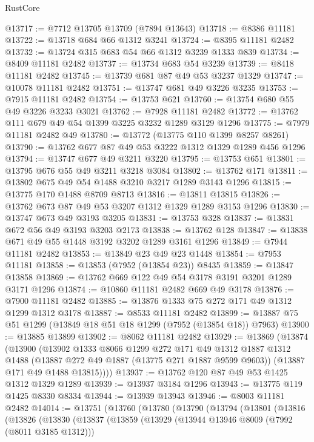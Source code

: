\begin{lexlean}{RustCore}
\begin{coremodule}
@13717 := @7712 @13705 @13709 (@7894 @13643)
@13718 := @8386 @11181
@13722 := @13718 @684 @66 @1312 @3241
@13724 := @8395 @11181 @2482
@13732 := @13724 @315 @683 @54 @66 @1312 @3239 @1333 @839
@13734 := @8409 @11181 @2482
@13737 := @13734 @683 @54 @3239
@13739 := @8418 @11181 @2482
@13745 := @13739 @681 @87 @49 @53 @3237 @1329
@13747 := @10078 @11181 @2482
@13751 := @13747 @681 @49 @3226 @3235
@13753 := @7915 @11181 @2482
@13754 := @13753 @621
@13760 := @13754 @680 @55 @49 @3226 @3233 @3021
@13762 := @7928 @11181 @2482
@13772 := @13762 @111 @679 @49 @54 @1399 @3225 @3232 @1289 @3129 @1296
@13775 := @7979 @11181 @2482 @49
@13780 := @13772 (@13775 @110 @1399 @8257 @8261)
@13790 := @13762 @677 @87 @49 @53 @3222 @1312 @1329 @1289 @456 @1296
@13794 := @13747 @677 @49 @3211 @3220
@13795 := @13753 @651
@13801 := @13795 @676 @55 @49 @3211 @3218 @3084
@13802 := @13762 @171
@13811 := @13802 @675 @49 @54 @1488 @3210 @3217 @1289 @3143 @1296
@13815 := @13775 @170 @1488 @8709 @8713
@13816 := @13811 @13815
@13826 := @13762 @673 @87 @49 @53 @3207 @1312 @1329 @1289 @3153 @1296
@13830 := @13747 @673 @49 @3193 @3205
@13831 := @13753 @328
@13837 := @13831 @672 @56 @49 @3193 @3203 @2173
@13838 := @13762 @128
@13847 := @13838 @671 @49 @55 @1448 @3192 @3202 @1289 @3161 @1296
@13849 := @7944 @11181 @2482
@13853 := @13849 @23 @49 @23 @1448
@13854 := @7953 @11181
@13858 := @13853 (@7952 (@13854 @23)) @8435
@13859 := @13847 @13858
@13869 := @13762 @669 @122 @49 @54 @3178 @3191 @3201 @1289 @3171 @1296
@13874 := @10860 @11181 @2482 @669 @49 @3178
@13876 := @7900 @11181 @2482
@13885 := @13876 @1333 @75 @272 @171 @49 @1312 @1299 @1312 @3178
@13887 := @8533 @11181 @2482
@13899 := @13887 @75 @51 @1299 (@13849 @18 @51 @18 @1299 (@7952 (@13854 @18)) @7963)
@13900 := @13885 @13899
@13902 := @8062 @11181 @2482
@13929 := @13869
    (@13874
      (@13900
        (@13902
          @1333
          @8066
          @1299
          @272
          @171
          @49
          @1312
          @1887
          @1312
          @1488
          (@13887 @272 @49 @1887 (@13775 @271 @1887 @9599 @9603))
          (@13887 @171 @49 @1488 @13815))))
@13937 := @13762 @120 @87 @49 @53 @1425 @1312 @1329 @1289
@13939 := @13937 @3184 @1296
@13943 := @13775 @119 @1425 @8330 @8334
@13944 := @13939 @13943
@13946 := @8003 @11181 @2482
@14014 := @13751
    (@13760
      (@13780
        (@13790
          (@13794
            (@13801
              (@13816
                (@13826
                  (@13830
                    (@13837
                      (@13859
                        (@13929
                          (@13944 @13946 @8009 (@7992 (@8011 @3185 @1312)))

\end{coremodule}
\end{lexlean}

